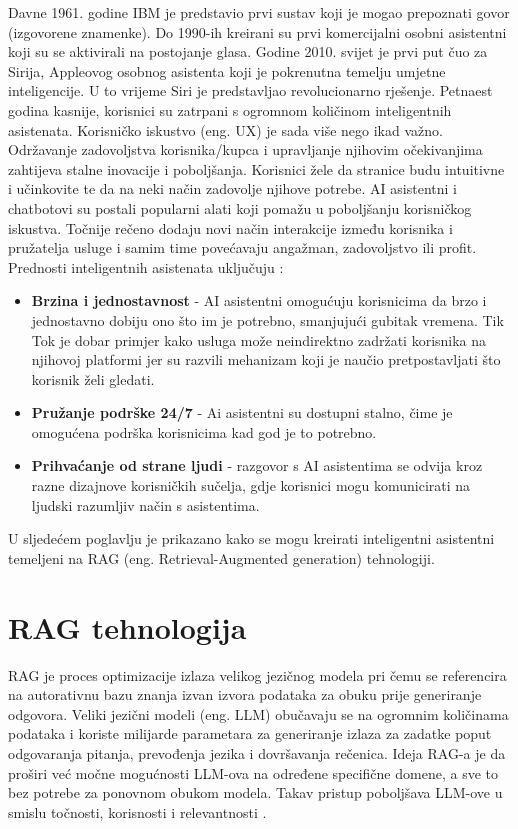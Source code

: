 \documentclass[]{foi}
\begin{document}
Davne 1961. godine IBM je predstavio prvi sustav koji je mogao prepoznati govor (izgovorene znamenke). Do 1990-ih kreirani su prvi komercijalni 
osobni asistentni koji su se aktivirali na postojanje glasa. Godine 2010. svijet je prvi put čuo za Sirija, Appleovog osobnog asistenta koji je 
pokrenutna temelju umjetne inteligencije. U to vrijeme Siri je predstavljao revolucionarno rješenje. Petnaest godina kasnije, korisnici su 
zatrpani s ogromnom količinom inteligentnih asistenata. Korisničko iskustvo (eng. UX) je sada više nego ikad važno. Održavanje zadovoljstva 
korisnika/kupca i upravljanje njihovim očekivanjima zahtijeva stalne inovacije i poboljšanja. Korisnici žele da stranice budu intuitivne i učinkovite
te da na neki način zadovolje njihove potrebe. AI asistentni i chatbotovi su postali popularni alati koji pomažu u poboljšanju korisničkog iskustva.
Točnije rečeno dodaju novi način interakcije između korisnika i pružatelja usluge i samim time povećavaju angažman, zadovoljstvo ili profit.
Prednosti inteligentnih asistenata uključuju \cite{buchan2024ai}:
\begin{itemize}
    \item \textbf{Brzina i jednostavnost} - AI asistentni omogućuju korisnicima da brzo i jednostavno dobiju ono što im je potrebno, smanjujući
    gubitak vremena. Tik Tok je dobar primjer kako usluga može neindirektno zadržati korisnika na njihovoj platformi jer su razvili mehanizam koji
    je naučio pretpostavljati što korisnik želi gledati.
    \item \textbf{Pružanje podrške 24/7} - Ai asistentni su dostupni stalno, čime je omogućena podrška korisnicima kad god je to potrebno. 
    \item \textbf{Prihvaćanje od strane ljudi} - razgovor s AI asistentima se odvija kroz razne dizajnove korisničkih sučelja, gdje korisnici mogu
    komunicirati na ljudski razumljiv način s asistentima. 
\end{itemize}

U sljedećem poglavlju je prikazano kako se mogu kreirati inteligentni asistentni temeljeni na RAG (eng. Retrieval-Augmented generation) tehnologiji.
\newpage
\section{RAG tehnologija}

RAG je proces optimizacije izlaza velikog jezičnog modela pri čemu se referencira na autorativnu bazu znanja izvan izvora podataka za obuku 
prije generiranje odgovora. Veliki jezični modeli (eng. LLM) obučavaju se na ogromnim količinama podataka i koriste milijarde parametara za 
generiranje izlaza za zadatke poput odgovaranja pitanja, prevođenja jezika i dovršavanja rečenica. Ideja RAG-a je da proširi već močne mogućnosti 
LLM-ova na određene specifične domene, a sve to bez potrebe za ponovnom obukom modela. Takav pristup poboljšava LLM-ove u smislu točnosti, 
korisnosti i relevantnosti \cite{awsRAG2025}.
\end{document}
